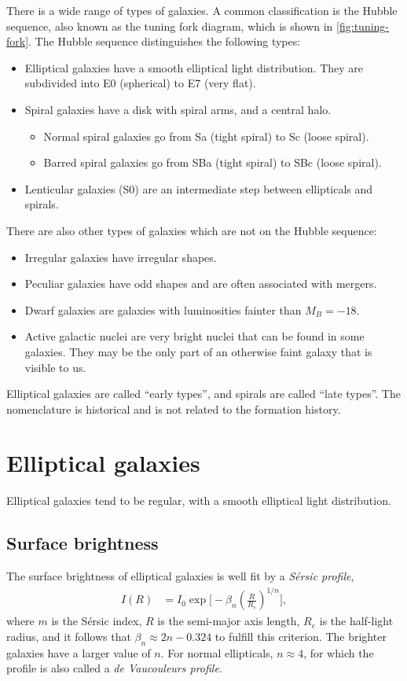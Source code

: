 There is a wide range of types of galaxies.
A common classification is the Hubble sequence, also known as the tuning fork diagram, which is shown in \cref{fig:tuning-fork}.
The Hubble sequence distinguishes the following types:
\begin{itemize}
	\item Elliptical galaxies have a smooth elliptical light distribution. They are subdivided into E0 (spherical) to E7 (very flat).
	\item Spiral galaxies have a disk with spiral arms, and a central halo.
	\begin{itemize}
		\item Normal spiral galaxies go from Sa (tight spiral) to Sc (loose spiral).
		\item Barred spiral galaxies go from SBa (tight spiral) to SBc (loose spiral).
	\end{itemize}
	\item Lenticular galaxies (S0) are an intermediate step between ellipticals and spirals.
\end{itemize}
There are also other types of galaxies which are not on the Hubble sequence:
\begin{itemize}
	\item Irregular galaxies have irregular shapes.
	\item Peculiar galaxies have odd shapes and are often associated with mergers.
	\item Dwarf galaxies are galaxies with luminosities fainter than $M_B = -18$.
	\item Active galactic nuclei are very bright nuclei that can be found in some galaxies. They may be the only part of an otherwise faint galaxy that is visible to us.
\end{itemize}

Elliptical galaxies are called \enquote{early types}, and spirals are called \enquote{late types}.
The nomenclature is historical and is not related to the formation history.



\section{Elliptical galaxies}
Elliptical galaxies tend to be regular, with a smooth elliptical light distribution.

\subsection{Surface brightness}
The surface brightness of elliptical galaxies is well fit by a \emph{Sérsic profile},
\begin{align*}
	I(R)
	&= I_0 \exp\Bigg[ - \beta_n \left( \frac{R}{R_e}  \right)^{1/n} \Bigg],
\end{align*}
where $m$ is the Sérsic index,
$R$ is the semi-major axis length,
$R_e$ is the half-light radius,
and it follows that $\beta_n \approx 2 n - 0.324$ to fulfill this criterion.
The brighter galaxies have a larger value of $n$.
For normal ellipticals, $n \approx 4$, for which the profile is also called a \emph{de Vaucouleurs profile}.

